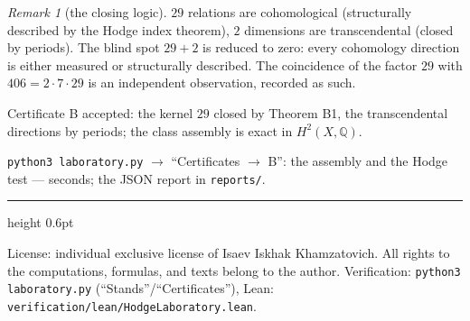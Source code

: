 \documentclass[11pt,a4paper]{article}
\theoremstyle{plain}
\theoremstyle{definition}
\theoremstyle{remark}
\newtheorem{remark}[theorem]{Remark}
\newcommand{\QQ}{\mathbb{Q}}
\begin{document}
\begin{remark}[the closing logic]
$29$ relations are cohomological (structurally described by the
Hodge index theorem), $2$ dimensions are transcendental (closed by
periods). The blind spot $29+2$ is reduced to zero: every
cohomology direction is either measured or structurally described.
The coincidence of the factor $29$ with $406=2\cdot7\cdot29$ is an
independent observation, recorded as such.
\end{remark}

\begin{statusbox}[summary]
Certificate B accepted: the kernel $29$ closed by Theorem B1, the
transcendental directions by periods; the class assembly is exact in
$H^2(X,\QQ)$.
\end{statusbox}

\begin{verifybox}[reproduction]
\texttt{python3 laboratory.py} $\to$ ``Certificates $\to$ B'': the
assembly and the Hodge test --- seconds; the JSON report in
\texttt{reports/}.
\end{verifybox}

\vfill
{\color{linkblue}\hrule height 0.6pt}
\vspace{0.5em}
{\small\color{gray}
License: individual exclusive license of Isaev Iskhak Khamzatovich.
All rights to the computations, formulas, and texts belong to the author.
Verification: \texttt{python3 laboratory.py} (``Stands''/``Certificates''),
Lean: \texttt{verification/lean/HodgeLaboratory.lean}.
}
\end{document}
